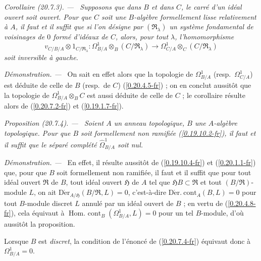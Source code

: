 \documentclass[10pt,oneside]{book}
\makeatletter
\newcommand{\sref}[1]{(\ref{#1})}
\newcommand{\setmanualcurrentlabel}[1]{\def\@currentlabel{#1}}
\newenvironment{proposition}[1][]{%
  \setmanualcurrentlabel{#1}\par\medskip\noindent\itshape Proposition (#1). ---\ }{\par}
\newenvironment{corollary}[1][]{%
  \setmanualcurrentlabel{#1}\par\medskip\noindent\itshape Corollaire (#1). ---\ }{\par}
\newenvironment{proof}{%
  \par\medskip\noindent\textit{Démonstration. ---\ }}{\par}
\makeatother
\begin{document}
\begin{corollary}[20.7.3]
\label{0.20.7.3-fr}
Supposons que dans $B$ et dans $C$, le carré d'un idéal ouvert soit ouvert.
Pour que $C$ soit une $B$-algèbre formellement lisse relativement à $A$, il
faut et il suffit que si l'on désigne par $(\mathfrak{R}_\lambda)$ un système
fondamental de voisinages de $0$ formé d'idéaux de $C$, alors, pour tout
$\lambda$, l'homomorphisme
\begin{equation}
\tag{20.7.3.1}
\label{0.20.7.3.1-fr}
  v_{C/B/A}\otimes 1_{C/\mathfrak{R}_\lambda}:
  \Omega^1_{B/A}\otimes_B(C/\mathfrak{R}_\lambda)\to
  \Omega^1_{C/A}\otimes_C(C/\mathfrak{R}_\lambda)
\end{equation}
soit inversible à gauche.
\end{corollary}

\begin{proof}
On sait en effet alors que la topologie de $\Omega^1_{B/A}$ (resp.\
$\Omega^1_{C/A}$) est déduite de celle de $B$ (resp.\ de $C$)
\sref{0.20.4.5-fr} ; on en conclut aussitôt que la topologie de
$\Omega^1_{B/A}\otimes_B C$ est aussi déduite de celle de $C$ ; le corollaire
résulte alors de \sref{0.20.7.2-fr} et \sref{0.19.1.7-fr}.
\end{proof}

\begin{proposition}[20.7.4]
\label{0.20.7.4-fr}
Soient $A$ un anneau topologique, $B$ une $A$-algèbre topologique. Pour que
$B$ soit formellement non ramifiée \sref{0.19.10.2-fr}, il faut et il suffit
que le séparé complété $\widehat{\Omega}^1_{B/A}$ soit nul.
\end{proposition}

\begin{proof}
En effet, il résulte aussitôt de \sref{0.19.10.4-fr} et
\sref{0.20.1.1-fr} que, pour que $B$ soit formellement non ramifiée, il faut et
il suffit que pour tout idéal ouvert $\mathfrak{R}$ de $B$, tout idéal ouvert
$\mathfrak{H}$ de $A$ tel que $\mathfrak{H}B\subset\mathfrak{R}$ et tout
$(B/\mathfrak{R})$-module $L$, on ait
$\operatorname{D\acute{e}r}_{A/\mathfrak{H}}(B/\mathfrak{R},L)=0$,
c'est-à-dire $\operatorname{D\acute{e}r.\ cont}_A(B,L)=0$ pour tout
$B$-module discret $L$ annulé par un idéal ouvert de $B$ ; en vertu de
\sref{0.20.4.8-fr}, cela équivaut à
$\operatorname{Hom.\ cont}_B(\Omega^1_{B/A},L)=0$ pour un tel $B$-module,
d'où aussitôt la proposition.

Lorsque $B$ est \emph{discret}, la condition de l'énoncé de
\sref{0.20.7.4-fr} équivaut donc à $\Omega^1_{B/A}=0$.
\end{proof}
\end{document}
